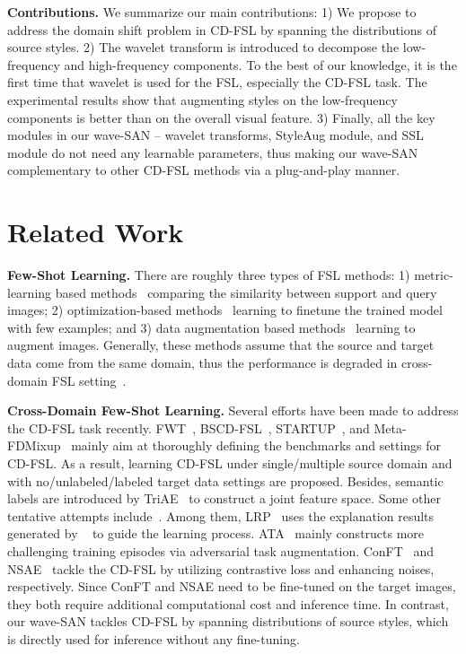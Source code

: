\documentclass{article}
\begin{document}
\noindent\textbf{Contributions.} We summarize our main contributions: 1) We propose to address the domain shift problem in CD-FSL by spanning the distributions of source styles. 2) The wavelet transform is introduced to decompose the low-frequency and high-frequency components. To the best of our knowledge, it is the first time that wavelet is used for the FSL, especially the CD-FSL task. The experimental results show that augmenting styles on the low-frequency components is better than on the overall visual feature. 3) Finally, all the key modules in our wave-SAN -- wavelet transforms, StyleAug module, and SSL module do not need any learnable parameters, thus making our wave-SAN complementary to other CD-FSL methods via a plug-and-play manner. 


\section{Related Work}
\noindent \textbf{Few-Shot Learning.}
There are roughly three types of FSL methods: 1) metric-learning based methods~\cite{snell2017prototypical,vinyals2016matching,sung2018learning,garcia2017few} comparing the similarity between support and query images; 2) optimization-based methods~\cite{finn2017model,munkhdalai2017meta,ravi2016optimization,rusu2018meta,lee2019meta} learning to finetune the trained model with few examples; and 3) data augmentation based methods~\cite{chen2019image,li2020adversarial,hariharan2017low} learning to augment images. Generally, these methods assume that the source and target data come from the same domain, thus the performance is degraded in cross-domain FSL setting~\cite{chen2019closer}. 

\noindent \textbf{Cross-Domain Few-Shot Learning.} 
Several efforts have been made to address the CD-FSL task recently. FWT~\cite{tseng2020cross}, BSCD-FSL~\cite{guo2020broader}, STARTUP~\cite{phoo2020self}, and Meta-FDMixup~\cite{fu2021meta} mainly aim at thoroughly defining the benchmarks and settings for CD-FSL. As a result, learning CD-FSL under single/multiple source domain and with no/unlabeled/labeled target data settings are proposed. Besides, semantic labels are introduced by TriAE~\cite{guan2020large} to construct a joint feature space. 
Some other tentative attempts include~\cite{sun2021explanation,adler2020cross,das2021importance,liang2021boosting,liu2020feature,yeh2020large,wang2021cross,islam2021dynamic,cai2021damsl,zhang2021shallow,chen2021self}. Among them, LRP~\cite{sun2021explanation} uses the explanation results generated by ~\cite{bach2015pixel} to guide the learning process. ATA~\cite{wang2021cross} mainly constructs more challenging training episodes via adversarial task augmentation. ConFT~\cite{das2021importance} and NSAE~\cite{liang2021boosting} tackle the CD-FSL by utilizing contrastive loss and enhancing noises, respectively. 
Since ConFT and NSAE need to be fine-tuned on the target images, they both require additional computational cost and inference time. 
In contrast, our wave-SAN tackles CD-FSL by spanning distributions of source styles, which is directly used for inference without any fine-tuning. 
\end{document}
